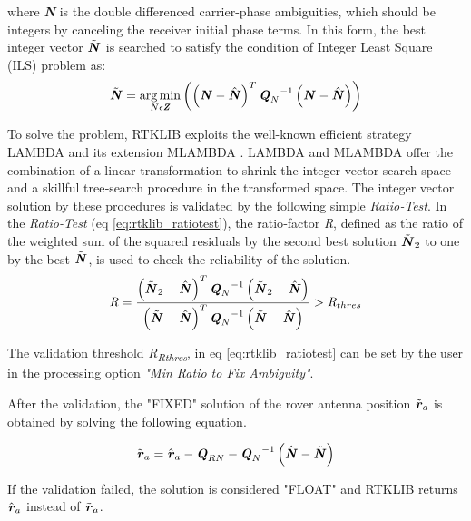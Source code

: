 where \textbf{\textit{N}} is the double differenced carrier-phase ambiguities,
which should be integers by canceling the receiver initial phase
terms. In this form, the best integer vector $\tilde{\textbf{\textit{N}}}$
is searched to satisfy the condition of Integer Least Square (ILS) problem as:
\begin{equation}
\tilde{\textbf{\textit{N}}}=  \operatorname*{arg\,min}_{N \epsilon \textbf{\textit{Z}}} \left( \left( \textbf{\textit{N}} - \hat{\textbf{\textit{N}}} \right)^{T} {\textbf{\textit{Q}}_{N}}^{-1} \left( \textbf{\textit{N}} - \hat{\textbf{\textit{N}}} \right) \right)
\label{eq:interger_amb_ILS_N}    
\end{equation}

To solve the problem, RTKLIB exploits the well-known efficient strategy LAMBDA \cite{Teunissen_ar1995} and its extension MLAMBDA \cite{chang2005}. LAMBDA and MLAMBDA offer the combination of a linear
transformation to shrink the integer vector search space and a skillful tree‐search procedure in the
transformed space. The integer vector solution by these procedures is validated by the following
simple \textit{Ratio‐Test}. In the \textit{Ratio‐Test} (eq \ref{eq:rtklib_ratiotest}), the ratio‐factor \textit{R}, defined as the ratio of the weighted sum of the squared residuals by the second best solution $\tilde{\textbf{\textit{N}}}_{2}$ to one by the best $\tilde{\textbf{\textit{N}}}$, is used to check the reliability of the solution.
\begin{equation}
\textit{R}=\frac{\left( \tilde{\textbf{\textit{N}}}_{2} - \hat{\textbf{\textit{N}}} \right)^{T} {\textbf{\textit{Q}}_{N}}^{-1} \left( \tilde{\textbf{\textit{N}}}_{2} - \hat{\textbf{\textit{N}}} \right) }{\left( \tilde{\textbf{\textit{N}}} - \hat{\textbf{\textit{N}}} \right)^{T} {\textbf{\textit{Q}}_{N}}^{-1} \left( \tilde{\textbf{\textit{N}}} - \hat{\textbf{\textit{N}}} \right)} > \textit{R}_{thres}
\label{eq:rtklib_ratiotest}
\end{equation}

The validation threshold \textit{R}\textsubscript{\textit{Rthres}}, in eq \ref{eq:rtklib_ratiotest} can be set by the user in the processing option  \textit{"Min Ratio to Fix Ambiguity"}. 

After the validation, the  "FIXED" solution of the rover antenna position $\tilde{\textbf{\textit{r}}}_{a}$ is obtained by solving the following equation. 

\begin{equation}
\tilde{\textbf{\textit{r}}}_{a}=\hat{\textbf{\textit{r}}}_{a}- \textbf{\textit{Q}}_{RN}-{\textbf{\textit{Q}}_{N}}^{-1} \left(\hat{\textbf{\textit{N}}} -\tilde{\textbf{\textit{N}}}\right)
\label{eq:rtklib_solution}
\end{equation}

If the validation failed, the solution is considered  "FLOAT" and RTKLIB returns $\hat{\textbf{\textit{r}}}_{a}$ instead of $\tilde{\textbf{\textit{r}}}_{a}$.
